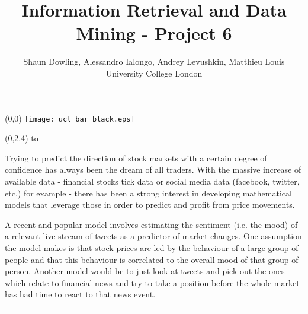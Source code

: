 \documentclass[a0]{a0poster}
\title{Information Retrieval and Data Mining - Project 6}
\author{Shaun Dowling, Alessandro Ialongo, Andrey Levushkin, Matthieu Louis\\ University College London}
\def\Head#1{\noindent\hbox to \hsize{\hfil{\LARGE\color{DarkBlue}\sf #1}}\bigskip}
\begin{document}
\begin{textblock}{23}(0,0)
\vspace*{-48mm}\hspace*{-42mm}%
\texttt{[image: ucl\_bar\_black.eps]}
\begin{minipage}{1191mm}		%
\vspace{-20cm}
\maketitle
\end{minipage}
\end{textblock}


\begin{textblock}{7}(0,2.4)
\Head{Introduction}

\sf %
Trying to predict the direction of stock markets with a certain degree of confidence has always been the dream of all traders. With the massive increase of available data - financial stocks tick data or social media data (facebook, twitter, etc.) for example - there has been a strong interest in developing mathematical models that leverage those in order to predict and profit from price movements.

A recent and popular model involves estimating the sentiment (i.e. the mood) of a relevant live stream of tweets as a predictor of market changes. One assumption the model makes is that stock prices are led by the behaviour of a large group of people and that this behaviour is correlated to the overall mood of that group of person. Another model would be to just look at tweets and pick out the ones which relate to financial news and try to take a position before the whole market has had time to react to that news event.


\bigskip
\hrule
\end{textblock}
\end{document}
